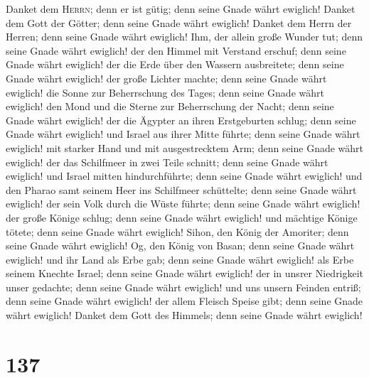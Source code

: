  Danket dem \textsc{Herrn}; denn er ist gütig; denn seine
Gnade währt ewiglich!  Danket dem Gott der Götter; denn
seine Gnade währt ewiglich!  Danket dem Herrn der Herren;
denn seine Gnade währt ewiglich!  Ihm, der allein große
Wunder tut; denn seine Gnade währt ewiglich!  der den
Himmel mit Verstand erschuf; denn seine Gnade währt ewiglich!
 der die Erde über den Wassern ausbreitete; denn seine
Gnade währt ewiglich!  der große Lichter machte; denn
seine Gnade währt ewiglich!  die Sonne zur Beherrschung
des Tages; denn seine Gnade währt ewiglich!  den Mond und
die Sterne zur Beherrschung der Nacht; denn seine Gnade währt ewiglich!
 der die Ägypter an ihren Erstgeburten schlug; denn seine
Gnade währt ewiglich!  und Israel aus ihrer Mitte führte;
denn seine Gnade währt ewiglich!  mit starker Hand und
mit ausgestrecktem Arm; denn seine Gnade währt ewiglich! 
der das Schilfmeer in zwei Teile schnitt; denn seine Gnade währt
ewiglich!  und Israel mitten hindurchführte; denn seine
Gnade währt ewiglich!  und den Pharao samt seinem Heer
ins Schilfmeer schüttelte; denn seine Gnade währt ewiglich!
 der sein Volk durch die Wüste führte; denn seine Gnade
währt ewiglich!  der große Könige schlug; denn seine
Gnade währt ewiglich!  und mächtige Könige tötete; denn
seine Gnade währt ewiglich!  Sihon, den König der
Amoriter; denn seine Gnade währt ewiglich!  Og, den König
von Basan; denn seine Gnade währt ewiglich!  und ihr Land
als Erbe gab; denn seine Gnade währt ewiglich!  als Erbe
seinem Knechte Israel; denn seine Gnade währt ewiglich! 
der in unsrer Niedrigkeit unser gedachte; denn seine Gnade währt
ewiglich!  und uns unsern Feinden entriß; denn seine
Gnade währt ewiglich!  der allem Fleisch Speise gibt;
denn seine Gnade währt ewiglich!  Danket dem Gott des
Himmels; denn seine Gnade währt ewiglich!

\hypertarget{section-136}{%
\section{137}\label{section-136}}

